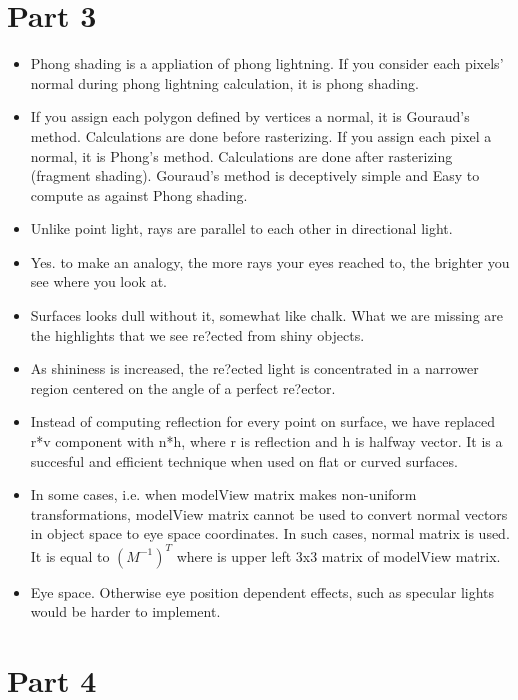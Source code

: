 \section{Part 3}
\label{sec:line-singledouble-logik}
\begin{itemize}
  \item Phong shading is a appliation of phong lightning. If you consider each pixels' normal during phong lightning calculation, it is phong shading.

  \item If you assign each polygon defined by vertices a normal, it is Gouraud's method. Calculations are done before rasterizing.
If you assign each pixel a normal, it is Phong's method. Calculations are done after rasterizing (fragment shading).
Gouraud's method is deceptively simple and Easy to compute as against Phong shading.
  \item Unlike point light, rays are parallel to each other in directional light.

  \item Yes. to make an analogy, the more rays your eyes reached to, the brighter you see where you look at.
  \item Surfaces looks dull without it, somewhat like chalk. What we are missing are the highlights that we see re?ected from shiny objects.
  \item As shininess is increased, the re?ected light is concentrated in a narrower region centered on the angle of a perfect re?ector.
  \item Instead of computing reflection for every point on surface, we have replaced r*v component with n*h, where r is reflection and
h is halfway vector. It is a succesful and efficient technique when used on flat or curved surfaces.
  \item In some cases, i.e. when modelView matrix makes non-uniform transformations, modelView matrix cannot be used to convert normal vectors
in object space to eye space coordinates. In such cases, normal matrix is used. It is equal to $ (M^{-1})^T $ where is upper left
3x3 matrix of modelView matrix.
 \item Eye space. Otherwise eye position dependent effects, such as specular lights would be harder to implement.

\end{itemize}

\section{Part 4}
\label{sec:diagramprogram}

